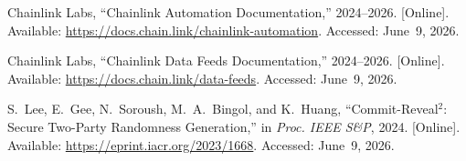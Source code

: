 \documentclass[12pt, a4paper]{report}
\begin{document}
{\begin{enumerate}[label={[\arabic*]}]
\item Chainlink Labs, ``Chainlink Automation Documentation,'' 2024--2026. [Online]. Available: \url{https://docs.chain.link/chainlink-automation}. Accessed: June~9, 2026.

\item Chainlink Labs, ``Chainlink Data Feeds Documentation,'' 2024--2026. [Online]. Available: \url{https://docs.chain.link/data-feeds}. Accessed: June~9, 2026.

\item S.~Lee, E.~Gee, N.~Soroush, M.~A.~Bingol, and K.~Huang, ``Commit-Reveal$^2$: Secure Two-Party Randomness Generation,'' in \textit{Proc. IEEE S\&P}, 2024. [Online]. Available: \url{https://eprint.iacr.org/2023/1668}. Accessed: June~9, 2026.
\end{enumerate}
}
\end{document}
